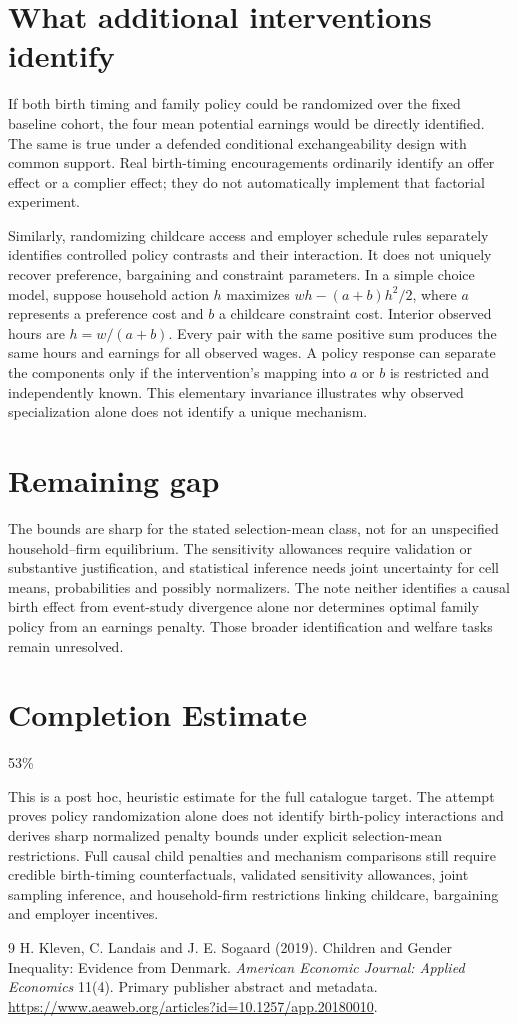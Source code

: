\documentclass[11pt]{article}
\theoremstyle{remark}
\begin{document}
\section*{What additional interventions identify}
If both birth timing and family policy could be randomized over the fixed baseline cohort, the four mean potential earnings would be directly identified. The same is true under a defended conditional exchangeability design with common support. Real birth-timing encouragements ordinarily identify an offer effect or a complier effect; they do not automatically implement that factorial experiment.

Similarly, randomizing childcare access and employer schedule rules separately identifies controlled policy contrasts and their interaction. It does not uniquely recover preference, bargaining and constraint parameters. In a simple choice model, suppose household action $h$ maximizes $w h-(a+b)h^2/2$, where $a$ represents a preference cost and $b$ a childcare constraint cost. Interior observed hours are $h=w/(a+b)$. Every pair with the same positive sum produces the same hours and earnings for all observed wages. A policy response can separate the components only if the intervention's mapping into $a$ or $b$ is restricted and independently known. This elementary invariance illustrates why observed specialization alone does not identify a unique mechanism.

\section*{Remaining gap}
The bounds are sharp for the stated selection-mean class, not for an unspecified household--firm equilibrium. The sensitivity allowances require validation or substantive justification, and statistical inference needs joint uncertainty for cell means, probabilities and possibly normalizers. The note neither identifies a causal birth effect from event-study divergence alone nor determines optimal family policy from an earnings penalty. Those broader identification and welfare tasks remain unresolved.

\section{Completion Estimate}
53\%

This is a post hoc, heuristic estimate for the full catalogue target.
The attempt proves policy randomization alone does not identify birth-policy interactions and derives sharp normalized penalty bounds under explicit selection-mean restrictions. Full causal child penalties and mechanism comparisons still require credible birth-timing counterfactuals, validated sensitivity allowances, joint sampling inference, and household-firm restrictions linking childcare, bargaining and employer incentives.

\begin{thebibliography}{9}
 H. Kleven, C. Landais and J. E. Sogaard (2019). Children and Gender Inequality: Evidence from Denmark. \emph{American Economic Journal: Applied Economics} 11(4). Primary publisher abstract and metadata. \url{https://www.aeaweb.org/articles?id=10.1257/app.20180010}.
\end{thebibliography}
\end{document}
